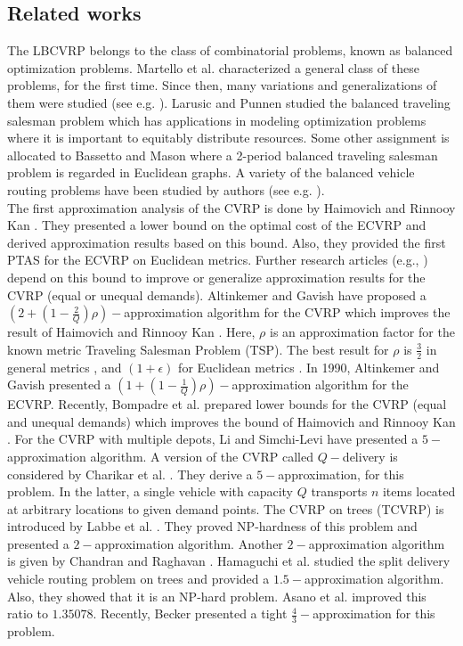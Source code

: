 \subsection{Related works}
\indent  The LBCVRP belongs to the class of combinatorial problems, known as balanced optimization problems. Martello et al. \cite{Martello} characterized a general class of these problems, for the first time. Since then, many variations and generalizations of them were studied (see e.g. \cite{Ahuja,Aydin,Cappanera}). Larusic and Punnen \cite{Larusic} studied the balanced traveling salesman problem which has applications in modeling optimization problems where it is important to equitably distribute resources. Some other assignment is allocated to Bassetto and Mason \cite{Bassetto} where a 2-period balanced traveling salesman problem is regarded in Euclidean graphs. A variety of the balanced vehicle routing problems have been studied by authors (see e.g. \cite{Borgulya,Chen2009,Chen2008,Lee,Matl,Tsouros,Yousefikhoshbakht}). \\ 
\indent The first approximation analysis of the CVRP is done by Haimovich and Rinnooy Kan \cite{Haimovich1985}. They presented a lower bound on the optimal cost of the ECVRP and derived approximation results based on this bound. Also, they provided the first PTAS for the ECVRP on Euclidean metrics. Further research articles (e.g., \cite{Altinkemer1990,Altinkemer1987,Li}) depend on this bound to improve or generalize approximation results for the CVRP (equal or unequal demands). Altinkemer and Gavish \cite{Altinkemer1987} have proposed a $(2+(1-\frac{2}{Q})\rho)-$approximation algorithm for the CVRP which improves the result of Haimovich and Rinnooy Kan \cite{Haimovich1985}. Here, $\rho$ is an approximation factor for the known metric Traveling Salesman Problem (TSP). The best result for $\rho$ is $\frac{3}{2}$ in general metrics \cite{Christofides}, and $(1+\epsilon)$ for Euclidean metrics \cite{Mitchell}. In 1990, Altinkemer and Gavish \cite{Altinkemer1990} presented a $(1+(1-\frac{1}{Q})\rho)-$approximation algorithm for the ECVRP. Recently, Bompadre et al. \cite{Bompadre} prepared lower bounds for the CVRP (equal and unequal demands) which improves the bound of Haimovich and Rinnooy Kan \cite{Haimovich1985}. For the CVRP with multiple depots, Li and Simchi-Levi \cite{Li} have presented a $5-$approximation algorithm. A version of the CVRP called $Q-$delivery is considered by Charikar et al. \cite{Charikar}. They derive a $5-$approximation, for this problem. In the latter, a single vehicle with capacity $Q$ transports $n$ items located at arbitrary locations to given demand points. The CVRP on trees (TCVRP) is introduced by Labbe et al. \cite{Labbe}. They proved NP-hardness of this problem and presented a $2-$approximation algorithm. Another $2-$approximation algorithm is given by Chandran and Raghavan \cite{Chandran}. Hamaguchi et al. \cite{Hamaguchi} studied the split delivery vehicle routing problem on trees and provided a $1.5-$approximation algorithm. Also, they showed that it is an NP-hard problem. Asano et al. \cite{Asano2001} improved this ratio to $1.35078$. Recently, Becker \cite{Becker} presented a tight $\frac{4}{3}-$approximation for this problem. \\

